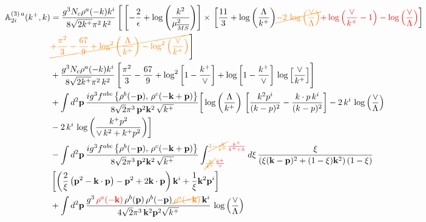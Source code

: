 \documentclass[aps,prd,amsmath,amssymb,nofootinbib]{revtex4-2}
\def\mf#1{\mathbb{#1}}
\numberwithin{equation}{section}
\begin{document}
\begin{align}
     \mf{A}^{(3)\, a}_{2i}(k^{+},k) & = \frac{g^{3}N_{c}\rho^{a}(-k)k^{i}}{8\sqrt{2k^{+}}\pi^{2}\,k^{2}}\,\Bigg[\left[-\frac{2}{\epsilon}+\log{\left(\frac{k^{2}}{\mu^{2}_{\overline{MS}}}\right)}\right]\times\, \left[\frac{11}{3}+\log{\left(\frac{\Lambda}{k^{+}}\right)}{\color{orange}\cancel{-2\,\log{\left(\frac{\vee}{\Lambda}\right)}}}{\color{red}+\log{\left(\frac{\vee}{k^{+}}-1\right)}-\log{\left(\frac{\vee}{\Lambda}\right)}}\right]\notag \\ & {\color{orange}\cancel{+ \frac{\pi^{2}}{3} - \frac{67}{9} +\log^{2}\left(\frac{\Lambda}{k^{+}}\right)-\log^{2}\left(\frac{\vee}{k^{+}}\right)}}\Bigg]\notag \\ & +\frac{g^{3}N_{c}\rho^{a}(-k)k^{i}}{8\sqrt{2k^{+}}\pi^{2}\,k^{2}}\, \Bigg[\frac{\pi^{2}}{3} - \frac{67}{9} + \log^{2}{\left[1-\frac{k^{+}}{\vee}\right]}+\log{\left[1-\frac{k^{+}}{\vee}\right]}\,\log{\left[\frac{\vee}{k^{+}}\right]}\Bigg]\notag \\ & +\int d^{2}\mathbf{p}\,\frac{ig^{3}f^{abc}\left\{ \rho^{b}(-\mathbf{p}),\,\rho^{c}(-\mathbf{k}+\mathbf{p})\right\}}{8\sqrt{2}\pi^{3}\,\mathbf{p}^{2}\mathbf{k}^{2}\,\sqrt{k^{+}}}\bigg[\log{\left(\frac{\Lambda}{k^{+}}\right)}\,\left[\frac{k^{2}p^{i}}{(k-p)^{2}}-\frac{k\cdot p\,k^{i}}{(k-p)^{2}}\right] -2\,k^{i}\,\log{\left(\frac{\vee}{\Lambda}\right)}\notag \\ &  -2\,k^{i}\,\log{\left(\frac{k^{+}p^{2}}{\vee\, k^{2}+k^{+}p^{2}}\right)}\bigg]\notag \\ &   - \int d^{2}\mathbf{p}\,\frac{ig^{3}f^{abc}\left\{ \rho^{b}(-\mathbf{p}),\,\rho^{c}(-\mathbf{k}+\mathbf{p})\right\}}{8\sqrt{2}\pi^{3}\,\mathbf{p}^{2}\mathbf{k}^{2}\,\sqrt{k^{+}}}\int_{{\color{orange}\cancel{\frac{\Lambda}{k^{+}}}}{\color{red}\frac{k^{+}}{\vee}}}^{{\color{orange}\cancel{1-\frac{\Lambda}{k^{+}}}}{\color{red}\frac{k^{+}}{k^{+}+\Lambda}}}d\xi\,\frac{\xi}{\left(\xi(\mathbf{k}-\mathbf{p})^{2}+(1-\xi)\mathbf{k}^{2}\right)(1-\xi)}\notag \\ & \left[\left(\frac{2}{\xi}\left(\mathbf{p}^{2}-\mathbf{k}\cdot\mathbf{p}\right)-\mathbf{p}^{2}+2\mathbf{k}\cdot\mathbf{p}\right)\mathbf{k}^{i} +\frac{1}{\xi}\mathbf{k}^{2}\mathbf{p}^{i}\right] \notag \\ & +\int d^{2}\mathbf{p}\,\frac{g^{3}\,{\color{red}\rho^{a}(-\mathbf{k})}\,\rho^{b}(\mathbf{p})\,\rho^{b}(-\mathbf{p}){\color{orange}\cancel{\,\rho^{a}(-\mathbf{k})}}\, \mathbf{k}^{i}}{4\sqrt{2}\pi^{3}\,\mathbf{k}^{2}\mathbf{p}^{2}\sqrt{k^{+}}}\,\log{\left(\frac{\vee}{\Lambda}\right)} 

\end{align}
\end{document}

